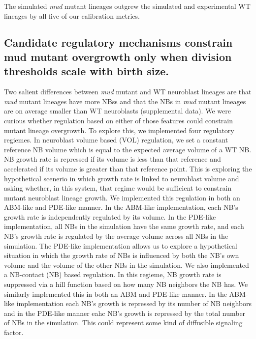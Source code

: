 The simulated \textit{mud} mutant lineages outgrew the simulated and experimental WT lineages by all five of our calibration metrics. %

\subsection{Candidate regulatory mechanisms constrain mud mutant overgrowth only when division thresholds scale with birth size.} %

Two salient differences between \textit{mud} mutant and WT neuroblast lineages are that \textit{mud} mutant lineages have more NBss and that the NBs in \textit{mud} mutant lineages are on average smaller than WT neuroblasts (supplemental data).
We were curious whether regulation based on either of those features could constrain mutant lineage overgrowth.
To explore this, we implemented four regulatory regiemes.
In neuroblast volume based (VOL) regulation, we set a constant reference NB volume which is equal to the expected average volume of a WT NB.
NB growth rate is repressed if its volume is less than that reference and accelerated if its volume is greater than that reference point.
This is exploring the hypothetical scenerio in which growth rate is linked to neuroblast volume and asking whether, in this system, that regime would be sufficient to constrain mutant neuroblast lineage growth.
We implemented this regulation in both an ABM-like and PDE-like manner.
In the ABM-like implementation, each NB's growth rate is independently regulated by its volume.
In the PDE-like implementation, all NBs in the simulation have the same growth rate, and each NB's growth rate is regulated by the average volume across all NBs in the simulation.
The PDE-like implementation allows us to explore a hypothetical situation in which the growth rate of NBs is influenced by both the NB's own volume and the volume of the other NBs in the simulation.
We also implemented a NB-contact (NB) based regulation.
In this regieme, NB growth rate is suppressed via a hill function based on how many NB neighbors the NB has.
We similarly implemented this in both an ABM and PDE-like manner.
In the ABM-like implementation each NB's growth is repressed by its number of NB neighbors and in the PDE-like manner eahc NB's growth is repressed by the total number of NBs in the simulation.
This could represent some kind of diffusible signaling factor.

